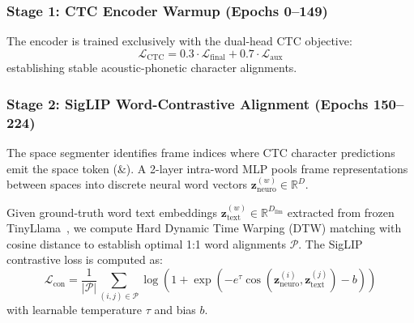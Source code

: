 \documentclass[conference]{IEEEtran}
\begin{document}
\subsubsection{Stage 1: CTC Encoder Warmup (Epochs 0--149)}
The encoder is trained exclusively with the dual-head CTC objective:
\begin{equation}
    \mathcal{L}_{\text{CTC}} = 0.3 \cdot \mathcal{L}_{\text{final}} + 0.7 \cdot \mathcal{L}_{\text{aux}}
\end{equation}
establishing stable acoustic-phonetic character alignments.

\subsubsection{Stage 2: SigLIP Word-Contrastive Alignment (Epochs 150--224)}
The space segmenter identifies frame indices where CTC character predictions emit the space token ($\&$). A 2-layer intra-word MLP pools frame representations between spaces into discrete neural word vectors $\mathbf{z}_{\text{neuro}}^{(w)} \in \mathbb{R}^{D}$. 

Given ground-truth word text embeddings $\mathbf{z}_{\text{text}}^{(w)} \in \mathbb{R}^{D_{\text{llm}}}$ extracted from frozen TinyLlama~\cite{tinyllama}, we compute Hard Dynamic Time Warping (DTW) matching with cosine distance to establish optimal 1:1 word alignments $\mathcal{P}$. The SigLIP contrastive loss is computed as:
\begin{equation}
    \mathcal{L}_{\text{con}} = \frac{1}{|\mathcal{P}|} \sum_{(i,j) \in \mathcal{P}} \log\left(1 + \exp\left(-e^\tau \cos(\mathbf{z}_{\text{neuro}}^{(i)}, \mathbf{z}_{\text{text}}^{(j)}) - b\right)\right)
\end{equation}
with learnable temperature $\tau$ and bias $b$.
\end{document}
